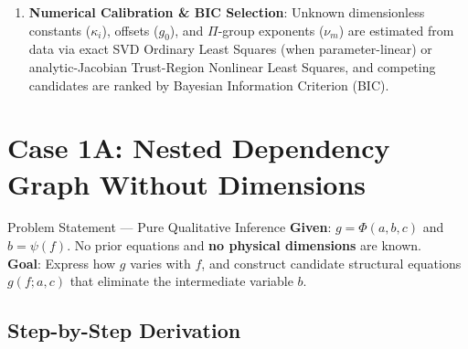 \documentclass[11pt,a4paper]{article}
\newcommand{\pd}[2]{\frac{\partial #1}{\partial #2}}
\begin{document}
\begin{enumerate}[leftmargin=1.5em,itemsep=4pt]
  \begin{equation}
    \pd{\beta_i}{x_j} = \pd{\beta_j}{x_i} \qquad \forall\, i < j.
  \end{equation}
  Solving this linear system couples separate unknown constants $\kappa_i$ automatically (reducing free parameters!), after which Poincar\'e line integration reconstructs $u(x_1,\dots,x_m)$ and bottom-up substitution yields $g(f)$.
  \item \textbf{Numerical Calibration \& BIC Selection}: Unknown dimensionless constants ($\kappa_i$), offsets ($g_0$), and $\Pi$-group exponents ($\nu_m$) are estimated from data via exact SVD Ordinary Least Squares (when parameter-linear) or analytic-Jacobian Trust-Region Nonlinear Least Squares, and competing candidates are ranked by Bayesian Information Criterion (BIC).
\end{enumerate}

\section{Case 1A: Nested Dependency Graph Without Dimensions}

\begin{setupbox}{Problem Statement — Pure Qualitative Inference}
\textbf{Given}: $g = \Phi(a, b, c)$ and $b = \psi(f)$. No prior equations and \textbf{no physical dimensions} are known.\\
\textbf{Goal}: Express how $g$ varies with $f$, and construct candidate structural equations $g(f; a, c)$ that eliminate the intermediate variable $b$.
\end{setupbox}

\begin{center}
\end{center}

\subsection*{Step-by-Step Derivation}
\end{document}
